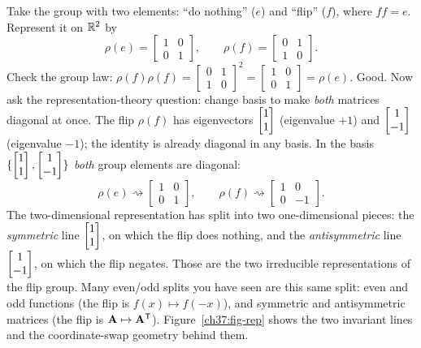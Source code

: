\begin{example}
\label{ch37:ex-rep}
Take the group with two elements: ``do nothing'' ($e$) and ``flip'' ($f$), where
$f f = e$. Represent it on $\mathbb{R}^2$ by
\[
  \rho(e) = \begin{bmatrix}1&0\\0&1\end{bmatrix},\qquad
  \rho(f) = \begin{bmatrix}0&1\\1&0\end{bmatrix}.
\]
Check the group law: $\rho(f)\rho(f) = \begin{bmatrix}0&1\\1&0\end{bmatrix}^2 =
\begin{bmatrix}1&0\\0&1\end{bmatrix} = \rho(e)$. Good. Now ask the
representation-theory question: change basis to make \emph{both} matrices diagonal
at once. The flip $\rho(f)$ has eigenvectors $\begin{bmatrix}1\\1\end{bmatrix}$ (eigenvalue $+1$) and
$\begin{bmatrix}1\\-1\end{bmatrix}$ (eigenvalue $-1$); the identity is already diagonal in any basis.
In the basis $\{\begin{bmatrix}1\\1\end{bmatrix},\begin{bmatrix}1\\-1\end{bmatrix}\}$ \emph{both} group elements are
diagonal:
\[
  \rho(e)\rightsquigarrow\begin{bmatrix}1&0\\0&1\end{bmatrix},\qquad
  \rho(f)\rightsquigarrow\begin{bmatrix}1&0\\0&-1\end{bmatrix}.
\]
The two-dimensional representation has split into two one-dimensional pieces: the
\emph{symmetric} line $\begin{bmatrix}1\\1\end{bmatrix}$, on which the flip does nothing, and the
\emph{antisymmetric} line $\begin{bmatrix}1\\-1\end{bmatrix}$, on which the flip negates. Those are the
two irreducible representations of the flip group. Many even/odd splits you
have seen are this same split: even and odd functions (the flip is
$f(x)\mapsto f(-x)$), and symmetric and antisymmetric matrices (the flip is
$\mathbf{A}\mapsto\mathbf{A}^{\mathsf{T}}$). Figure~\ref{ch37:fig-rep} shows the two invariant lines and the
coordinate-swap geometry behind them.
\end{example}

